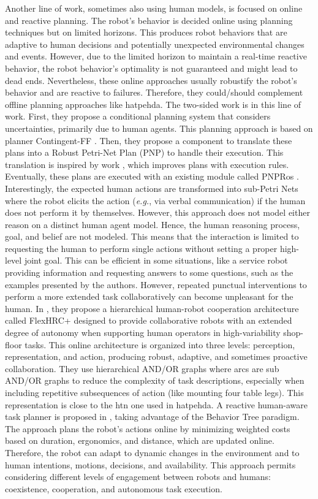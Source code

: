 Another line of work, sometimes also using human models, is focused on online and reactive planning. The robot's behavior is decided online using planning techniques but on limited horizons. This produces robot behaviors that are adaptive to human decisions and potentially unexpected environmental changes and events. However, due to the limited horizon to maintain a real-time reactive behavior, the robot behavior's optimality is not guaranteed and might lead to dead ends. Nevertheless, these online approaches usually robustify the robot's behavior and are reactive to failures. Therefore, they could/should complement offline planning approaches like \acrshort{hatpehda}.
The two-sided work \cite{sanelli_short_term_2017} is in this line of work. First, they propose a conditional planning system that considers uncertainties, primarily due to human agents. This planning approach is based on planner Contingent-FF \cite{hoffmann2005contingent}. Then, they propose a component to translate these plans into a Robust Petri-Net Plan (PNP) to handle their execution. This translation is inspired by work \cite{iocchi2016practical}, which improves plans with execution rules. Eventually, these plans are executed with an existing module called PNPRos \cite{ziparo2011petri}. Interestingly, the expected human actions are transformed into sub-Petri Nets where the robot elicits the action (\textit{e.g.}, via verbal communication) if the human does not perform it by themselves. 
However, this approach does not model either reason on a distinct human agent model. Hence, the human reasoning process, goal, and belief are not modeled. This means that the interaction is limited to requesting the human to perform single actions without setting a proper high-level joint goal. This can be efficient in some situations, like a service robot providing information and requesting answers to some questions, such as the examples presented by the authors. However, repeated punctual interventions to perform a more extended task collaboratively can become unpleasant for the human.
In \cite{DarvishSMC21}, they propose a hierarchical human-robot cooperation architecture called FlexHRC+ designed to provide collaborative robots with an extended degree of autonomy when supporting human operators in high-variability shop-floor tasks. This online architecture is organized into three levels: perception, representation, and action, producing robust, adaptive, and sometimes proactive collaboration. 
They use hierarchical AND/OR graphs where arcs are sub AND/OR graphs to reduce the complexity of task descriptions, especially when including repetitive subsequences of action (like mounting four table legs). This representation is close to the \acrshort{htn} one used in \acrshort{hatpehda}. 
A reactive human-aware task planner is proposed in \cite{fusaro_human_aware_2021}, taking advantage of the Behavior Tree paradigm. The approach plans the robot's actions online by minimizing weighted costs based on duration, ergonomics, and distance, which are updated online. Therefore, the robot can adapt to dynamic changes in the environment and to human intentions, motions, decisions, and availability. This approach permits considering different levels of engagement between robots and humans: coexistence, cooperation, and autonomous task execution. 

